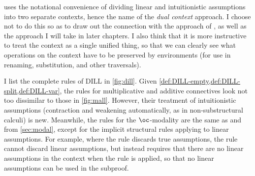  uses the notational convenience of dividing linear and
intuitionistic assumptions into two separate contexts, hence the name of the
\emph{dual context} approach.
I choose not to do this so as to draw out the connection with the approach of
\citet{judgmental}, as well as the approach I will take in later chapters.
I also think that it is more instructive to treat the context as a single
unified thing, so that we can clearly see what operations on the context have
to be preserved by environments (for use in renaming, substitution, and other
traversals).

I list the complete rules of DILL in \cref{fig:dill}.
Given \cref{def:DILL-empty,def:DILL-split,def:DILL-var}, the rules for
multiplicative and additive connectives look not too dissimilar to those in
\cref{fig:mall}.
However, their treatment of intuitionistic assumptions (contraction and
weakening automatically, as in non-substructural calculi) is new.
Meanwhile, the rules for the $\oc$-modality are the same as 
and  from \cref{sec:modal}, except for the implicit structural
rules applying to linear assumptions.
For example, where the  rule discards true assumptions, the
 rule cannot discard linear assumptions, but instead requires
that there are no linear assumptions in the context when the rule is applied, so
that no linear assumptions can be used in the subproof.

